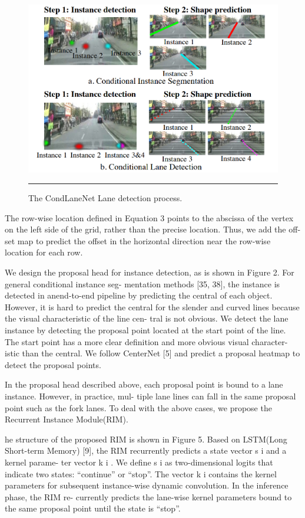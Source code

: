 \begin{figure}[htbp]
	\centering
		\includegraphics[scale=0.4]{Figures/condlaneprocess.png}
		\rule{35em}{0.5pt}
	\caption[The CondLaneNet Lane detection Process]{The CondLaneNet Lane detection process.}
	\label{fig:The CondLaneNet Lane Detection Process}
\end{figure}

The row-wise location defined in Equation 3
points to the abscissa of the vertex on the left side of the
grid, rather than the precise location. Thus, we add the off-
set map to predict the offset in the horizontal direction near
the row-wise location for each row.


We design the proposal head for instance detection, as is
shown in Figure 2. For general conditional instance seg-
mentation methods [35, 38], the instance is detected in anend-to-end pipeline by predicting the central of each object.
However, it is hard to predict the central for the slender and
curved lines because the visual characteristic of the line cen-
tral is not obvious.
We detect the lane instance by detecting the proposal
point located at the start point of the line. The start point has
a more clear definition and more obvious visual character-
istic than the central. We follow CenterNet [5] and predict
a proposal heatmap to detect the proposal points.


In the proposal head described above, each proposal
point is bound to a lane instance. However, in practice, mul-
tiple lane lines can fall in the same proposal point such as
the fork lanes. To deal with the above cases, we propose the
Recurrent Instance Module(RIM).

he structure of the proposed RIM is shown in Figure 5.
Based on LSTM(Long Short-term Memory) [9], the RIM
recurrently predicts a state vector s i and a kernel parame-
ter vector k i . We define s i as two-dimensional logits that
indicate two states: “continue” or “stop”. The vector k i
contains the kernel parameters for subsequent instance-wise
dynamic convolution. In the inference phase, the RIM re-
currently predicts the lane-wise kernel parameters bound to
the same proposal point until the state is “stop”.

